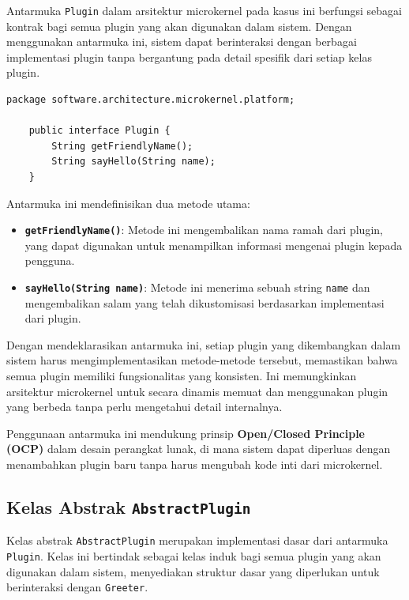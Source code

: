 Antarmuka \texttt{Plugin} dalam arsitektur microkernel pada kasus ini berfungsi sebagai kontrak bagi semua plugin yang akan digunakan dalam sistem. Dengan menggunakan antarmuka ini, sistem dapat berinteraksi dengan berbagai implementasi plugin tanpa bergantung pada detail spesifik dari setiap kelas plugin.

\begin{lstlisting}[style=JavaStyle, caption={Antarmuka \texttt{Plugin}}, label={lst:plugin-interface}]
	package software.architecture.microkernel.platform;
	
	public interface Plugin {
		String getFriendlyName();
		String sayHello(String name);
	}
\end{lstlisting}

\noindent
Antarmuka ini mendefinisikan dua metode utama:

\begin{itemize}
	\item \textbf{\texttt{getFriendlyName()}}: Metode ini mengembalikan nama ramah dari plugin, yang dapat digunakan untuk menampilkan informasi mengenai plugin kepada pengguna.
	\item \textbf{\texttt{sayHello(String name)}}: Metode ini menerima sebuah string \texttt{name} dan mengembalikan salam yang telah dikustomisasi berdasarkan implementasi dari plugin.
\end{itemize}

Dengan mendeklarasikan antarmuka ini, setiap plugin yang dikembangkan dalam sistem harus mengimplementasikan metode-metode tersebut, memastikan bahwa semua plugin memiliki fungsionalitas yang konsisten. Ini memungkinkan arsitektur microkernel untuk secara dinamis memuat dan menggunakan plugin yang berbeda tanpa perlu mengetahui detail internalnya.

Penggunaan antarmuka ini mendukung prinsip \textbf{Open/Closed Principle (OCP)} dalam desain perangkat lunak, di mana sistem dapat diperluas dengan menambahkan plugin baru tanpa harus mengubah kode inti dari microkernel.


\subsection{Kelas Abstrak \texttt{AbstractPlugin}}

Kelas abstrak \texttt{AbstractPlugin} merupakan implementasi dasar dari antarmuka \texttt{Plugin}. Kelas ini bertindak sebagai kelas induk bagi semua plugin yang akan digunakan dalam sistem, menyediakan struktur dasar yang diperlukan untuk berinteraksi dengan \texttt{Greeter}.

